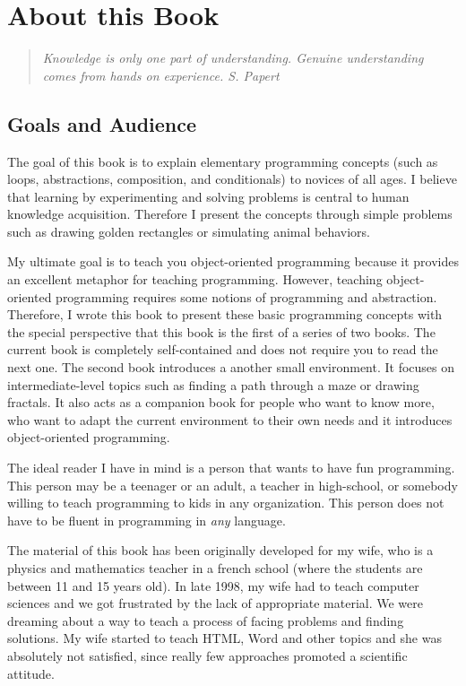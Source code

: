 \ifx\wholebook\relax\else



\fi

\chapter*{About this Book}

\begin{quote}\textit{Knowledge is only one part of understanding. Genuine understanding comes from hands on experience. S. Papert}
\end{quote}

\section*{Goals and Audience}
The goal of this book is to explain elementary programming concepts (such as loops, abstractions, composition, and conditionals) to novices of all ages. I believe that learning by experimenting and solving problems is central to human knowledge acquisition. Therefore I present the concepts through simple problems such as drawing golden rectangles or simulating animal behaviors. 

My ultimate goal is to teach you object-oriented programming because it provides an excellent metaphor for teaching programming. However, teaching object-oriented programming requires some notions of programming and abstraction. Therefore, I wrote this book to present these basic programming concepts with the special perspective that this book is the first of a series of two books. The current book is completely self-contained and does not require you to read the next one. The second book introduces a another small environment. It focuses on intermediate-level topics such as finding a path through a  maze or drawing fractals. It also acts as a companion book for people who want to know more, who want to adapt the current environment to their own needs and  it  introduces object-oriented programming. 

The ideal reader I have in mind is a person that wants to have fun programming. This person may be a teenager or an adult, a teacher in high-school, or somebody willing to teach programming to kids in any organization. This person does not have to be fluent in programming in \emph{any} language. 

The material of this book has been originally developed for my wife, who is a physics and mathematics teacher in a french school (where the students  are between 11 and 15 years old). In late 1998, my wife had to teach computer sciences and we got frustrated by the lack of appropriate material. We were dreaming about a way to teach a process of facing problems and finding solutions. My wife started to teach HTML, Word and other topics and she was absolutely not satisfied, since really few approaches  promoted a scientific attitude.  

